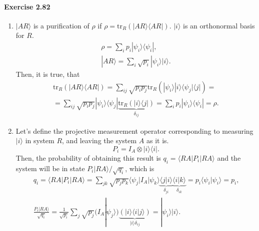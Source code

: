 \documentclass[a4paper,12pt]{article}
\newcommand{\exercise}[1]{\paragraph{Exercise #1}}
\newcommand{\la}{\langle}
\newcommand{\ra}{\rangle}
\begin{document}
    \exercise{2.82}
    \begin{enumerate}[label=(\arabic*)]
        \item $|AR \ra$ is a purification of $\rho$ if $\rho = \textrm{tr}_R(| AR \ra \la AR|)$. $|i \ra$ is an orthonormal basis for $R$.
            \begin{gather}
                \rho = \sum_i p_i | \psi_i \ra \la \psi_i | \textrm{,} \\
                | AR \ra = \sum_i \sqrt{p_i} | \psi_i \ra |i \ra \textrm{.}
            \end{gather}
            Then, it is true, that
            \begin{gather}
                \nonumber
                \textrm{tr}_R ( | AR \ra \la AR | ) =
                \sum_{ij} \sqrt{p_i p_j} \textrm{tr}_R ( | \psi_i \ra | i \ra \la \psi_j | \la j | ) =\\
                = \sum_{ij} \sqrt{p_i p_j} | \psi_i \ra \la \psi_j | \underbrace{\textrm{tr}_R ( | i \ra \la j | ) }_{\delta_{ij}} =
                \sum_i p_i | \psi_i \ra \la \psi_i | = \rho \textrm{.}
            \end{gather}

        \item Let's define the projective measurement operator corresponding to measuring $|i \ra$ in system $R$, and leaving the system $A$ as it is.
            \begin{equation}
                P_i = I_A \otimes |i \ra \la i | \textrm{.}
            \end{equation}
            Then, the probability of obtaining this result is $q_i = \la RA | P_i | RA \ra$ and the system will be in state $P_i | RA \ra / \sqrt{q_i}$, which is
            \begin{gather}
                \nonumber
                q_i = \la RA | P_i | RA \ra = \sum_{jk} \sqrt{p_j p_k} \la \psi_j | I_A | \psi_k \ra \underbrace{\la j | i \ra}_{\delta_{ji}} \underbrace{\la i | k \ra}_{\delta_{ik}} = p_i \la \psi_i | \psi_i \ra = p_i \textrm{,} \\
                \frac{P_i | RA \ra}{\sqrt{q_i}} = \frac{1}{\sqrt{p_i}} \sum_j \sqrt{p_j} (I_A | \psi_j \ra ) \underbrace{(|i \ra \la i | j \ra)}_{|i \ra \delta_{ij}} = | \psi_i \ra | i \ra \textrm{.}
            \end{gather}


\end{enumerate}
\end{document}
